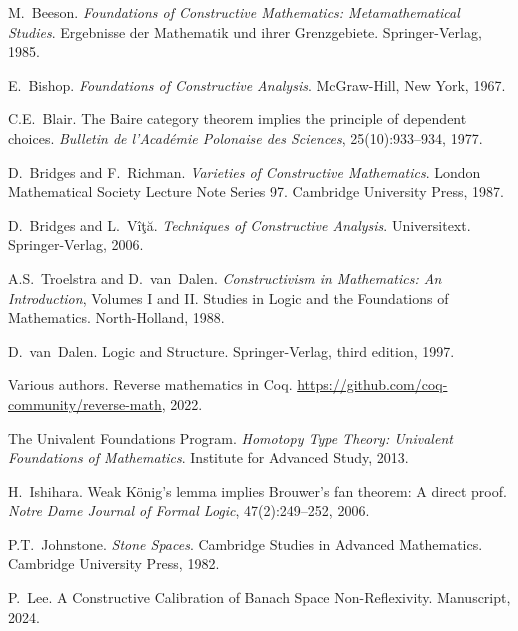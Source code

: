 \documentclass[11pt]{article}
\theoremstyle{plain}
\theoremstyle{definition}
\begin{document}

\begin{thebibliography}{99}

M.~Beeson.
\newblock \emph{Foundations of Constructive Mathematics: Metamathematical Studies}.
\newblock Ergebnisse der Mathematik und ihrer Grenzgebiete. Springer-Verlag, 1985.

E.~Bishop.
\newblock \emph{Foundations of Constructive Analysis}.
\newblock McGraw-Hill, New York, 1967.

C.E.~Blair.
\newblock The {B}aire category theorem implies the principle of dependent choices.
\newblock \emph{Bulletin de l'Acad\'{e}mie Polonaise des Sciences}, 25(10):933--934, 1977.

D.~Bridges and F.~Richman.
\newblock \emph{Varieties of Constructive Mathematics}.
\newblock London Mathematical Society Lecture Note Series 97. Cambridge University Press, 1987.

D.~Bridges and L.~Vîţă.
\newblock \emph{Techniques of Constructive Analysis}.
\newblock Universitext. Springer-Verlag, 2006.

A.S.~Troelstra and D.~van~Dalen.
\newblock \emph{Constructivism in Mathematics: An Introduction}, Volumes I and II.
\newblock Studies in Logic and the Foundations of Mathematics. North-Holland, 1988.

D.~van~Dalen.
\newblock Logic and Structure.
\newblock Springer-Verlag, third edition, 1997.

Various authors.
\newblock Reverse mathematics in {Coq}.
\newblock \url{https://github.com/coq-community/reverse-math}, 2022.

The {Univalent Foundations Program}.
\newblock \emph{Homotopy Type Theory: Univalent Foundations of Mathematics}.
\newblock Institute for Advanced Study, 2013.

H.~Ishihara.
\newblock Weak {K}\"{o}nig's lemma implies {B}rouwer's fan theorem: A direct proof.
\newblock \emph{Notre Dame Journal of Formal Logic}, 47(2):249--252, 2006.

P.T.~Johnstone.
\newblock \emph{Stone Spaces}.
\newblock Cambridge Studies in Advanced Mathematics. Cambridge University Press, 1982.

P.~Lee.
\newblock A Constructive Calibration of Banach Space Non-Reflexivity.
\newblock Manuscript, 2024.


\end{thebibliography}
\end{document}
